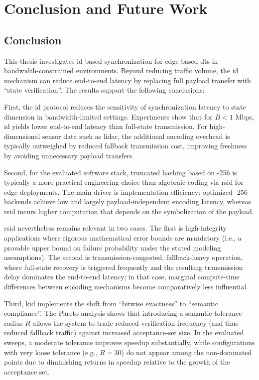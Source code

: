 \chapter{Conclusion and Future Work}
\label{ch:conclusion_and_future_work}
\label{sec:conclusion_and_future_work}

\section{Conclusion}
\label{sec:conclusion}

This thesis investigates \gls{id}-based synchronization for edge-based \glspl{dt} in bandwidth-constrained environments. Beyond reducing traffic volume, the \gls{id} mechanism can reduce end-to-end latency by replacing full payload transfer with \enquote{state verification}. The results support the following conclusions:

First, the \gls{id} protocol reduces the sensitivity of synchronization latency to state dimension in bandwidth-limited settings. Experiments show that for $B < 1$ Mbps, \gls{id} yields lower end-to-end latency than full-state transmission. For high-dimensional sensor data such as \gls{lidar}, the additional encoding overhead is typically outweighed by reduced fallback transmission cost, improving freshness by avoiding unnecessary payload transfers.

Second, for the evaluated software stack, truncated hashing based on -256 is typically a more practical engineering choice than algebraic coding via \gls{rsid} for edge deployments. The main driver is implementation efficiency: optimized -256 backends achieve low and largely payload-independent encoding latency, whereas \gls{rsid} incurs higher computation that depends on the symbolization of the payload.

\gls{rsid} nevertheless remains relevant in two cases. The first is high-integrity applications where rigorous mathematical error bounds are mandatory (i.e., a provable upper bound on failure probability under the stated modeling assumptions). The second is transmission-congested, fallback-heavy operation, where full-state recovery is triggered frequently and the resulting transmission delay dominates the end-to-end latency; in that case, marginal compute-time differences between encoding mechanisms become comparatively less influential.

Third, \gls{kid} implements the shift from \enquote{bitwise exactness} to \enquote{semantic compliance}. The Pareto analysis shows that introducing a semantic tolerance radius $R$ allows the system to trade reduced verification frequency (and thus reduced fallback traffic) against increased acceptance-set size. In the evaluated sweeps, a moderate tolerance improves speedup substantially, while configurations with very loose tolerance (e.g., $R=30$) do not appear among the non-dominated points due to diminishing returns in speedup relative to the growth of the acceptance set.

